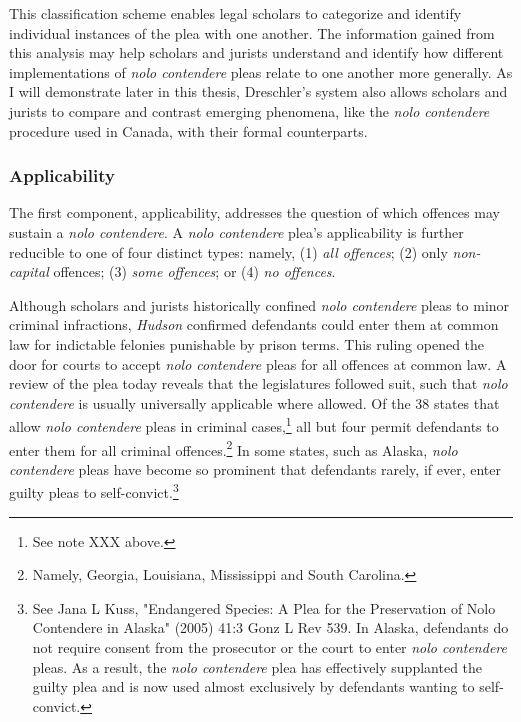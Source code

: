 This classification scheme enables legal scholars to categorize and identify individual instances of the plea with one another. The information gained from this analysis may help scholars and jurists understand and identify how different implementations of \textit{nolo contendere} pleas relate to one another more generally. As I will demonstrate later in this thesis, Dreschler's system also allows scholars and jurists to compare and contrast emerging phenomena, like the \textit{nolo contendere} procedure used in Canada, with their formal counterparts.

\subsubsection{Applicability}

The first component, applicability, addresses the question of which offences may sustain a \textit{nolo contendere}. A \textit{nolo contendere} plea's applicability is further reducible to one of four distinct types: namely, (1) \textit{all offences}; (2) only \textit{non-capital} offences; (3) \textit{some offences}; or (4) \textit{no offences}. 

Although scholars and jurists historically confined \textit{nolo contendere} pleas to minor criminal infractions, \textit{Hudson} confirmed defendants could enter them at common law for indictable felonies punishable by prison terms. This ruling opened the door for courts to accept \textit{nolo contendere} pleas for all offences at common law. A review of the plea today reveals that the legislatures followed suit, such that \textit{nolo contendere} is usually universally applicable where allowed. Of the 38 states that allow \textit{nolo contendere} pleas in criminal cases,\footnote{See note XXX above.} all but four permit defendants to enter them for all criminal offences.\footnote{Namely, Georgia, Louisiana, Mississippi and South Carolina.} In some states, such as Alaska, \textit{nolo contendere} pleas have become so prominent that defendants rarely, if ever, enter guilty pleas to self-convict.\footnote{See Jana L Kuss, "Endangered Species: A Plea for the Preservation of Nolo Contendere in
Alaska" (2005) 41:3 Gonz L Rev 539. In Alaska, defendants do not require consent from the prosecutor or the court to enter \textit{nolo contendere} pleas. As a result, the \textit{nolo contendere} plea has effectively supplanted the guilty plea and is now used almost exclusively by defendants wanting to self-convict.}

